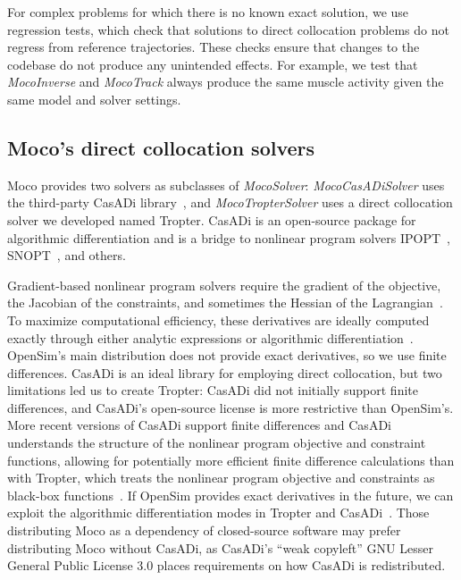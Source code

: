 \documentclass[10pt,letterpaper]{article}
\begin{document}
For complex problems for which there is no known exact solution, we use regression tests, which check that solutions to direct collocation problems do not regress from reference trajectories. These checks ensure that changes to the codebase do not produce any unintended effects. For example, we test that \textit{MocoInverse} and \textit{MocoTrack} always produce the same muscle activity given the same model and solver settings.


\subsection*{Moco's direct collocation solvers}

Moco provides two solvers as subclasses of \textit{MocoSolver}: \textit{MocoCasADiSolver} uses the third-party CasADi library~\cite{Andersson:2019}, and \textit{MocoTropterSolver} uses a direct collocation solver we developed named Tropter. CasADi is an open-source package for algorithmic differentiation and is a bridge to nonlinear program solvers IPOPT~\cite{Wachter:2006}, SNOPT~\cite{Gill:2005}, and others.

Gradient-based nonlinear program solvers require the gradient of the objective, the Jacobian of the constraints, and sometimes the Hessian of the Lagrangian~\cite{Betts:2010}. To maximize computational efficiency, these derivatives are ideally computed exactly through either analytic expressions or algorithmic differentiation~\cite{Andersson:2019,Walther:2003}. OpenSim's main distribution does not provide exact derivatives, so we use finite differences. CasADi is an ideal library for employing direct collocation, but two limitations led us to create Tropter: CasADi did not initially support finite differences, and CasADi's open-source license is more restrictive than OpenSim's. More recent versions of CasADi support finite differences and CasADi understands the structure of the nonlinear program objective and constraint functions, allowing for potentially more efficient finite difference calculations than with Tropter, which treats the nonlinear program objective and constraints as black-box functions~\cite{Patterson:2012}. If OpenSim provides exact derivatives in the future, we can exploit the algorithmic differentiation modes in Tropter and CasADi~\cite{Falisse:2019a}. Those distributing Moco as a dependency of closed-source software may prefer distributing Moco without CasADi, as CasADi's ``weak copyleft'' GNU Lesser General Public License 3.0 places requirements on how CasADi is redistributed.

\nolinenumbers

%
%
%


\end{document}
